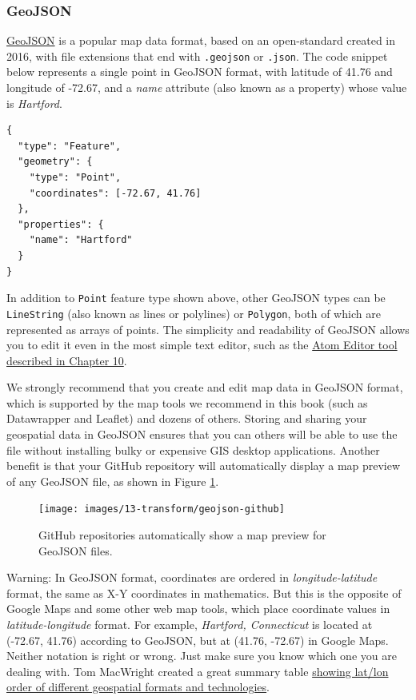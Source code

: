 \documentclass[
  english,
]{book}
\begin{document}
\hypertarget{geojson-1}{%
\subsubsection*{GeoJSON}\label{geojson-1}}

\href{https://geojson.org}{GeoJSON} is a popular map data format, based on an open-standard created in 2016, with file extensions that end with \texttt{.geojson} or \texttt{.json}. The code snippet below represents a single point in GeoJSON format, with latitude of 41.76 and longitude of -72.67, and a \emph{name} attribute (also known as a property) whose value is \emph{Hartford}.

\begin{verbatim}
{
  "type": "Feature",
  "geometry": {
    "type": "Point",
    "coordinates": [-72.67, 41.76]
  },
  "properties": {
    "name": "Hartford"
  }
}
\end{verbatim}

In addition to \texttt{Point} feature type shown above, other GeoJSON types can be \texttt{LineString} (also known as lines or polylines) or \texttt{Polygon}, both of which are represented as arrays of points. The simplicity and readability of GeoJSON allows you to edit it even in the most
simple text editor, such as the \href{github-desktop-atom.html}{Atom Editor tool described in Chapter 10}.

We strongly recommend that you create and edit map data in GeoJSON format, which is supported by the map tools we recommend in this book (such as Datawrapper and Leaflet) and dozens of others. Storing and sharing your geospatial data in GeoJSON ensures that you can others will be able to use the file without installing bulky or expensive GIS desktop applications. Another benefit is that your GitHub repository will automatically display a map preview of any GeoJSON file, as shown in Figure \ref{fig:geojson-github}.



\begin{figure}
\texttt{[image: images/13-transform/geojson-github]} \caption{GitHub repositories automatically show a map preview for GeoJSON files.}\label{fig:geojson-github}
\end{figure}

Warning: In GeoJSON format, coordinates are ordered in \emph{longitude-latitude} format, the same as X-Y coordinates in mathematics. But this is the opposite of Google Maps and some other web map tools, which place coordinate values in \emph{latitude-longitude} format. For example, \emph{Hartford, Connecticut} is located at (-72.67, 41.76) according to GeoJSON, but at (41.76, -72.67) in Google Maps. Neither notation is right or wrong. Just make sure you know which one you are dealing with. Tom MacWright created a great summary table
\href{https://macwright.com/lonlat/}{showing lat/lon order of different geospatial formats and technologies}.
\end{document}
